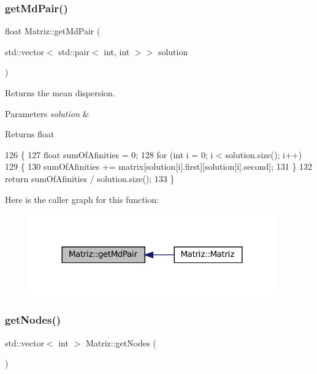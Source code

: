 \subsubsection{\texorpdfstring{get\+Md\+Pair()}{getMdPair()}}
{\footnotesize\ttfamily float Matriz\+::get\+Md\+Pair (\begin{DoxyParamCaption}\item[{std\+::vector$<$ std\+::pair$<$ int, int $>$$>$}]{solution }\end{DoxyParamCaption})}



Returns the mean dispersion. 


\begin{DoxyParams}{Parameters}
{\em solution} & \\
\hline
\end{DoxyParams}
\begin{DoxyReturn}{Returns}
float 
\end{DoxyReturn}

\begin{DoxyCode}
126 \{
127   \textcolor{keywordtype}{float} sumOfAfinities = 0;
128   \textcolor{keywordflow}{for} (\textcolor{keywordtype}{int} i = 0; i < solution.size(); i++)
129   \{
130       sumOfAfinities += matrix[solution[i].first][solution[i].second];
131   \}
132   \textcolor{keywordflow}{return} sumOfAfinities / solution.size();
133 \}
\end{DoxyCode}
Here is the caller graph for this function\+:
\nopagebreak
\begin{figure}[H]
\begin{center}
\leavevmode
\includegraphics[width=300pt]{classMatriz_a61efbcc7ea661059ed0dfad32b5273cf_icgraph}
\end{center}
\end{figure}
\mbox{\label{classMatriz_a394b84a5ec13fd2f4d202ab218680afe}} 
\subsubsection{\texorpdfstring{get\+Nodes()}{getNodes()}}
{\footnotesize\ttfamily std\+::vector$<$ int $>$ Matriz\+::get\+Nodes (\begin{DoxyParamCaption}{ }\end{DoxyParamCaption})}



